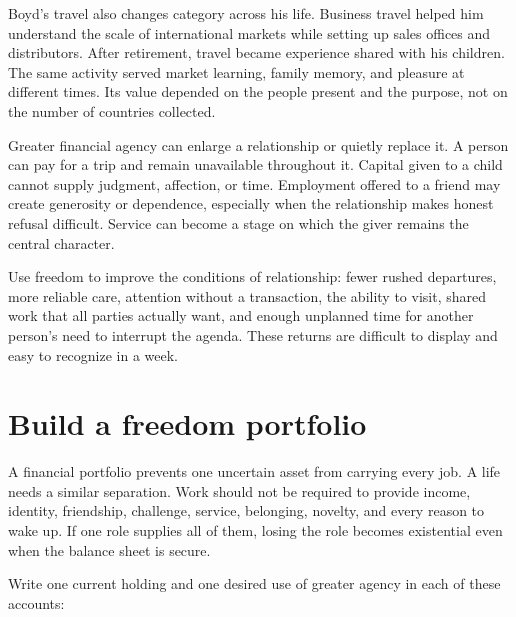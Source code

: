 Boyd's travel also changes category across his life. Business travel helped
him understand the scale of international markets while setting up sales
offices and distributors. After retirement, travel became experience shared
with his children. The same activity served market learning, family memory,
and pleasure at different times. Its value depended on the people present and
the purpose, not on the number of countries collected.

Greater financial agency can enlarge a relationship or quietly replace it. A
person can pay for a trip and remain unavailable throughout it. Capital given
to a child cannot supply judgment, affection, or time. Employment offered to a
friend may create generosity or dependence, especially when the relationship
makes honest refusal difficult. Service can become a stage on which the giver
remains the central character.

Use freedom to improve the conditions of relationship: fewer rushed
departures, more reliable care, attention without a transaction, the ability
to visit, shared work that all parties actually want, and enough unplanned time
for another person's need to interrupt the agenda. These returns are difficult
to display and easy to recognize in a week.

\section{Build a freedom portfolio}

A financial portfolio prevents one uncertain asset from carrying every job.
A life needs a similar separation. Work should not be required to provide
income, identity, friendship, challenge, service, belonging, novelty, and
every reason to wake up. If one role supplies all of them, losing the role
becomes existential even when the balance sheet is secure.

Write one current holding and one desired use of greater agency in each of
these accounts:

